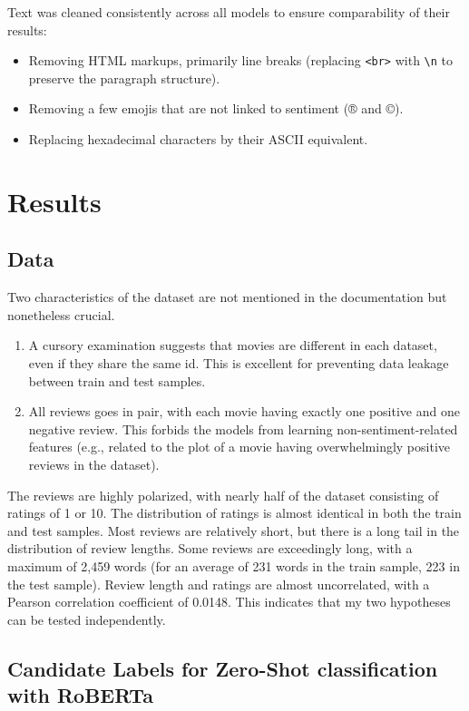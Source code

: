 \documentclass{article}
\begin{document}
Text was cleaned consistently across all models to ensure comparability of their results:
\begin{itemize}
    \item Removing HTML markups, primarily line breaks (replacing \texttt{<br>} with \texttt{\textbackslash n} to preserve the paragraph structure).
	\item Removing a few emojis that are not linked to sentiment (® and ©).
    \item Replacing hexadecimal characters by their ASCII equivalent.
\end{itemize}

\section{Results}

\subsection{Data}

Two characteristics of the dataset are not mentioned in the documentation but nonetheless crucial.
\begin{enumerate}
    \item A cursory examination suggests that movies are different in each dataset, even if they share the same id. This is excellent for preventing data leakage between train and test samples.
	\item All reviews goes in pair, with each movie having exactly one positive and one negative review. This forbids the models from learning non-sentiment-related features (e.g., related to the plot of a movie having overwhelmingly positive reviews in the dataset).
\end{enumerate}

The reviews are highly polarized, with nearly half of the dataset consisting of ratings of 1 or 10. The distribution of ratings is almost identical in both the train and test samples. Most reviews are relatively short, but there is a long tail in the distribution of review lengths. Some reviews are exceedingly long, with a maximum of 2,459 words (for an average of 231 words in the train sample, 223 in the test sample). Review length and ratings are almost uncorrelated, with a Pearson correlation coefficient of 0.0148. This indicates that my two hypotheses can be tested independently.

\subsection{Candidate Labels for Zero-Shot classification with RoBERTa}
\end{document}
